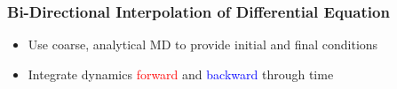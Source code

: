 \documentclass[usenames, dvipsnames, t]{beamer}
\newcommand{\red}[1]{\textcolor{red}{#1}}
\newcommand{\blue}[1]{\textcolor{blue}{#1}}
\begin{document}
\begin{frame}
	\frametitle{Bi-Directional Interpolation of Differential Equation}
	\begin{itemize}
		\item<+-> Use coarse, analytical MD to provide initial and final conditions
		\item<4-> Integrate dynamics \red{forward} \onslide<5-> and \blue{backward} through time
	\end{itemize}
	\onslide<+->
				
		
				
				
		
		

\end{frame}
\end{document}
